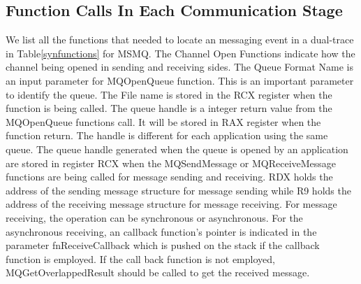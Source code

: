 \subsection{Function Calls In Each Communication Stage}
We list all the functions that needed to locate an messaging event in a dual-trace in Table\ref{synfunctions} for MSMQ. The Channel Open Functions indicate how the channel being opened in sending and receiving sides. The Queue Format Name is an input parameter for MQOpenQueue function. This is an important parameter to identify the queue. The File name is stored in the RCX register when the function is being called. The queue handle is a integer return value from the MQOpenQueue functions call. It will be stored in RAX register when the function return. The handle is different for each application using the same queue. The queue handle generated when the queue is opened by an application are stored in register RCX when the MQSendMessage or MQReceiveMessage functions are being called for message sending and receiving. RDX holds the address of the sending message structure for message sending while R9 holds the address of the receiving message structure for message receiving. For message receiving, the operation can be synchronous or asynchronous. For the asynchronous receiving, an callback function's pointer is indicated in the parameter fnReceiveCallback which is pushed on the stack if the callback function is employed. If the call back function is not employed, MQGetOverlappedResult should be called to get the received message.


